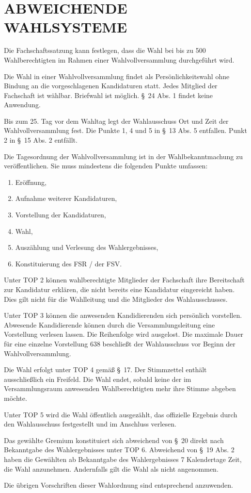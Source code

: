 \documentclass[%
draft,%
multilinesections%
]{fswo}
\begin{document}
\section{ABWEICHENDE WAHLSYSTEME}
\begin{contract}
Die Fachschaftssatzung kann festlegen, dass die Wahl bei bis zu 500 Wahlberechtigten im Rahmen einer Wahlvollversammlung durchgeführt wird.

Die Wahl in einer Wahlvollversammlung findet als Persönlichkeitswahl ohne Bindung an die vorgeschlagenen Kandidaturen statt.
Jedes Mitglied der Fachschaft ist wählbar.
Briefwahl ist möglich.
\S~24 Abs. 1 findet keine Anwendung.

Bis zum 25. Tag vor dem Wahltag legt der Wahlausschuss Ort und Zeit der Wahlvollversammlung fest.
Die Punkte 1, 4 und 5 in \S~13 Abs. 5 entfallen. Punkt 2 in \S~15 Abs. 2 entfällt.

Die Tagesordnung der Wahlvollversammlung ist in der Wahlbekanntmachung zu veröffentlichen.
Sie muss mindestens die folgenden Punkte umfassen:
\begin{enumerate}
\item Eröffnung,
\item Aufnahme weiterer Kandidaturen,
\item Vorstellung der Kandidaturen,
\item Wahl,
\item Auszählung und Verlesung des Wahlergebnisses,
\item Konstituierung des FSR / der FSV.
\end{enumerate}

Unter TOP 2 können wahlberechtigte Mitglieder der Fachschaft ihre Bereitschaft zur Kandidatur erklären, die nicht bereits eine Kandidatur eingereicht haben.
Dies gilt nicht für die Wahlleitung und die Mitglieder des Wahlausschusses.

Unter TOP 3 können die anwesenden Kandidierenden sich persönlich vorstellen.
Abwesende Kandidierende können durch die Versammlungsleitung eine Vorstellung verlesen lassen.
Die Reihenfolge wird ausgelost.
Die maximale Dauer für eine einzelne Vorstellung 638 beschließt der Wahlausschuss vor Beginn der Wahlvollversammlung.

Die Wahl erfolgt unter TOP 4 gemäß \S~17.
Der Stimmzettel enthält ausschließlich ein Freifeld.
Die Wahl endet, sobald keine der im Versammlungsraum anwesenden Wahlberechtigten mehr ihre Stimme abgeben möchte.

Unter TOP 5 wird die Wahl öffentlich ausgezählt, das offizielle Ergebnis durch den Wahlausschuss festgestellt und im Anschluss verlesen.

Das gewählte Gremium konstituiert sich abweichend von \S~20 direkt nach Bekanntgabe des Wahlergebnisses unter TOP 6.
Abweichend von \S~19 Abs. 2 haben die Gewählten ab Bekanntgabe des Wahlergebnisses 7 Kalendertage Zeit, die Wahl anzunehmen.
Andernfalls gilt die Wahl als nicht angenommen.

Die übrigen Vorschriften dieser Wahlordnung sind entsprechend anzuwenden.
\end{contract}
\end{document}

